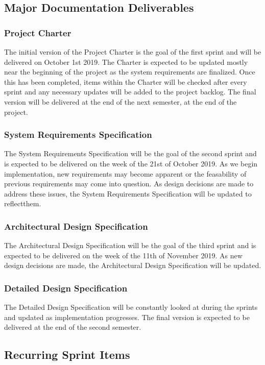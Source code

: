 \subsection{Major Documentation Deliverables}

\subsubsection{Project Charter}
The initial version of the Project Charter is the goal of the first sprint and will be delivered on October 1st 2019. 
The Charter is expected to be updated mostly near the beginning of the project as the system requirements are finalized. Once this has been completed, items within the Charter will be checked after every sprint and any necessary updates will be added to the project backlog. The final version will be delivered at the end of the next semester, at the end of the project.

\subsubsection{System Requirements Specification}
The System Requirements Specification will be the goal of the second sprint and is expected to be delivered on the week of the 21st of October 2019. As we begin implementation, new requirements may become apparent or the feasability of previous requirements may come into question. As design decisions are made to address these issues, the System Requirements Specification will be updated to reflectthem.

\subsubsection{Architectural Design Specification}
The Architectural Design Specification will be the goal of the third sprint and is expected to be delivered on the week of the 11th of November 2019. As new design decisions are made, the Architectural Design Specification will be updated.

\subsubsection{Detailed Design Specification}
The Detailed Design Specification will be constantly looked at during the sprints and updated as implementation progresses. The final version is expected to be delivered at the end of the second semester.

\subsection{Recurring Sprint Items}

